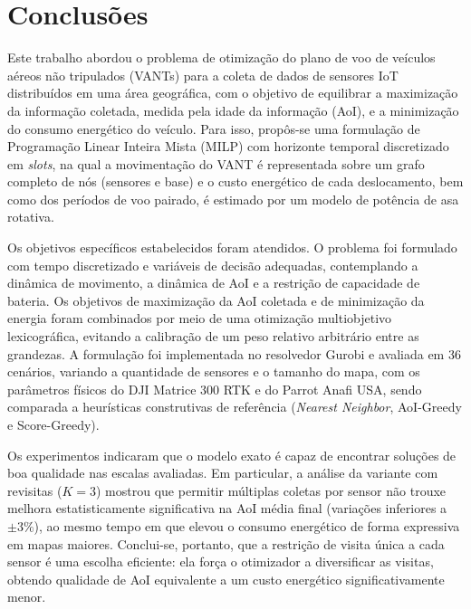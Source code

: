 \chapter{Conclusões}
\label{cap:conclusao}

Este trabalho abordou o problema de otimização do plano de voo de veículos aéreos não tripulados (VANTs) para a coleta de dados de sensores IoT distribuídos em uma área geográfica, com o objetivo de equilibrar a maximização da informação coletada, medida pela idade da informação (AoI), e a minimização do consumo energético do veículo. Para isso, propôs-se uma formulação de Programação Linear Inteira Mista (MILP) com horizonte temporal discretizado em \textit{slots}, na qual a movimentação do VANT é representada sobre um grafo completo de nós (sensores e base) e o custo energético de cada deslocamento, bem como dos períodos de voo pairado, é estimado por um modelo de potência de asa rotativa.

Os objetivos específicos estabelecidos foram atendidos. O problema foi formulado com tempo discretizado e variáveis de decisão adequadas, contemplando a dinâmica de movimento, a dinâmica de AoI e a restrição de capacidade de bateria. Os objetivos de maximização da AoI coletada e de minimização da energia foram combinados por meio de uma otimização multiobjetivo lexicográfica, evitando a calibração de um peso relativo arbitrário entre as grandezas. A formulação foi implementada no resolvedor Gurobi e avaliada em 36 cenários, variando a quantidade de sensores e o tamanho do mapa, com os parâmetros físicos do DJI Matrice 300 RTK e do Parrot Anafi USA, sendo comparada a heurísticas construtivas de referência (\textit{Nearest Neighbor}, AoI-Greedy e Score-Greedy).

Os experimentos indicaram que o modelo exato é capaz de encontrar soluções de boa qualidade nas escalas avaliadas. Em particular, a análise da variante com revisitas ($K=3$) mostrou que permitir múltiplas coletas por sensor não trouxe melhora estatisticamente significativa na AoI média final (variações inferiores a $\pm 3\%$), ao mesmo tempo em que elevou o consumo energético de forma expressiva em mapas maiores. Conclui-se, portanto, que a restrição de visita única a cada sensor é uma escolha eficiente: ela força o otimizador a diversificar as visitas, obtendo qualidade de AoI equivalente a um custo energético significativamente menor.

